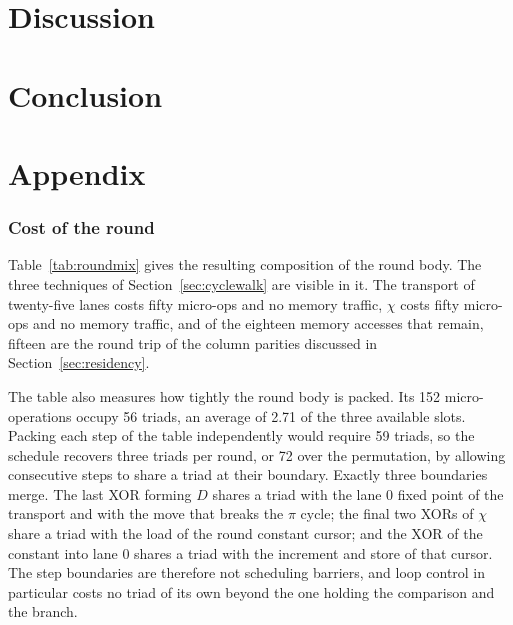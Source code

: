 \documentclass[journal=tches,submission]{iacrtrans}
\begin{document}
\section{Discussion}

\section{Conclusion}

\section*{Appendix}

\subsubsection{Cost of the round}

Table~\ref{tab:roundmix} gives the resulting composition of the round body. The
three techniques of Section~\ref{sec:cyclewalk} are
visible in it. The transport of twenty-five lanes costs fifty micro-ops and no
memory traffic, $\chi$ costs fifty micro-ops and no memory traffic, and of the
eighteen memory accesses that remain, fifteen are the round trip of the column
parities discussed in Section~\ref{sec:residency}.

The table also measures how tightly the round body is packed. Its 152
micro-operations occupy 56 triads, an average of 2.71 of the three available
slots. Packing each step of the table independently would require 59 triads, so
the schedule recovers three triads per round, or 72 over the permutation, by
allowing consecutive steps to share a triad at their boundary. Exactly three
boundaries merge. The last XOR forming $D$ shares a triad with the lane 0 fixed
point of the transport and with the move that breaks the $\pi$ cycle; the final
two XORs of $\chi$ share a triad with the load of the round constant cursor; and
the XOR of the constant into lane 0 shares a triad with the increment and store
of that cursor. The step boundaries are therefore not scheduling barriers, and
loop control in particular costs no triad of its own beyond the one holding the
comparison and the branch.
\end{document}
